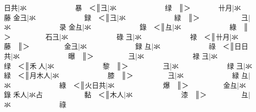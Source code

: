 {\cjk{}{\cnsym{}　　　　}日共}|{\cjk{}氺{\cnsym{}　　　　　　　}暴{\cnsym{}　}＜}║{\cjk{}{\cnsym{}　　　　　}彐}|{\cjk{}氺{\cnsym{}　　　　　　　}绿{\cnsym{}　}}║{\cjk{}＞{\cnsym{}　　　　}卄月}|{\cjk{}氺{\cnsym{}　　　　　　　}藤} 
{\cjk{}{\cnsym{}　　　　}金彐}|{\cjk{}氺{\cnsym{}　　　　　　　}録{\cnsym{}　}＜}║{\cjk{}{\cnsym{}　　　　　}彐}|{\cjk{}氺{\cnsym{}　　　　　　　}緑{\cnsym{}　}}║{\cjk{}＞{\cnsym{}　　　　　　}彐}|{\cjk{}氺{\cnsym{}　　　　　　　}录} 
{\cjk{}{\cnsym{}　　　　}金彑}|{\cjk{}氺{\cnsym{}　　　　　　　}錄{\cnsym{}　}＜}║{\cjk{}{\cnsym{}　　　　　}彑}|{\cjk{}氺{\cnsym{}　　　　　　　}綠{\cnsym{}　}}║{\cjk{}＞{\cnsym{}　　　　　}石彐}|{\cjk{}氺{\cnsym{}　　　　　　　}碌} 
{\cjk{}{\cnsym{}　　　　}彐}|{\cjk{}氺{\cnsym{}　　　　　　　}禄{\cnsym{}　}＜}║{\cjk{}{\cnsym{}　　　　}卄月}|{\cjk{}氺{\cnsym{}　　　　　　　}藤{\cnsym{}　}}║{\cjk{}＞{\cnsym{}　　　　　}金彐}|{\cjk{}氺{\cnsym{}　　　　　　　}録} 
{\cjk{}{\cnsym{}　　　　}彑}|{\cjk{}氺{\cnsym{}　　　　　　　}祿{\cnsym{}　}＜}║{\cjk{}{\cnsym{}　　　　}日日共}|{\cjk{}氺{\cnsym{}　　　　　　　}曝{\cnsym{}　}}║{\cjk{}＞{\cnsym{}　　　　　}彐}|{\cjk{}氺{\cnsym{}　　　　　　　}禄} 
{\cjk{}{\cnsym{}　　　　}彐}|{\cjk{}氺{\cnsym{}　　　　　　　}绿{\cnsym{}　}＜}║{\cjk{}{\cnsym{}　　　　}禾{\cnjzr{}}人}|{\cjk{}氺{\cnsym{}　　　　　　　}黎{\cnsym{}　}}║{\cjk{}＞{\cnsym{}　　　　　}彐}|{\cjk{}氺{\cnsym{}　　　　　　　}绿} 
{\cjk{}{\cnsym{}　　　　}彐}|{\cjk{}氺{\cnsym{}　　　　　　　}緑{\cnsym{}　}＜}║{\cjk{}{\cnsym{}　　　　}月木人}|{\cjk{}氺{\cnsym{}　　　　　　　}膝{\cnsym{}　}}║{\cjk{}＞{\cnsym{}　　　　　}彐}|{\cjk{}氺{\cnsym{}　　　　　　　}緑} 
{\cjk{}{\cnsym{}　　　　}彑}|{\cjk{}氺{\cnsym{}　　　　　　　}綠{\cnsym{}　}＜}║{\cjk{}{\cnsym{}　　　　}火日共}|{\cjk{}氺{\cnsym{}　　　　　　　}爆{\cnsym{}　}}║{\cjk{}＞{\cnsym{}　　　　　}金彑}|{\cjk{}氺{\cnsym{}　　　　　　　}錄} 
{\cjk{}{\cnsym{}　　　　}禾人}|{\cjk{}氺占{\cnsym{}　　　　　　}黏{\cnsym{}　}＜}║{\cjk{}{\cnsym{}　　　　}木人}|{\cjk{}氺{\cnsym{}　　　　　　　}漆{\cnsym{}　}}║{\cjk{}＞{\cnsym{}　　　　　}彑}|{\cjk{}氺{\cnsym{}　　　　　　　}祿} 
